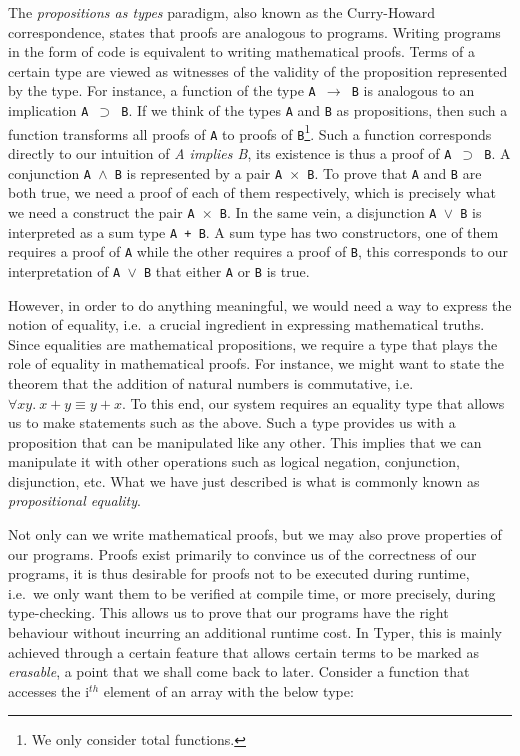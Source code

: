 \documentclass[12pt,twoside,maitrise]{dms}
\theoremstyle{definition}
\numberwithin{equation}{section}
\numberwithin{table}{chapter}
\numberwithin{figure}{chapter}
\newcommand\fn[1] {\texttt{#1}}
\begin{document}
The \emph{propositions as types} paradigm, also known as the Curry-Howard
correspondence, states that proofs are analogous to programs. Writing programs
in the form of code is equivalent to writing mathematical proofs. Terms of a
certain type are viewed as witnesses of the validity of the proposition
represented by the type. For instance, a function of the type \fn{A
  $\rightarrow$ B} is analogous to an implication \fn{A $\supset$ B}. If we
think of the types \fn{A} and \fn{B} as propositions, then such a function
transforms all proofs of \fn{A} to proofs of \fn{B}\footnote{We only consider
total functions.}. Such a function corresponds directly to our intuition of
\emph{A implies B}, its existence is thus a proof of \fn{A $\supset$ B}. A
conjunction \fn{A $\wedge$ B} is represented by a pair \fn{A $\times$ B}. To
prove that \fn{A} and \fn{B} are both true, we need a proof of each of them
respectively, which is precisely what we need a construct the pair \fn{A
  $\times$ B}. In the same vein, a disjunction \fn{A $\vee$ B} is interpreted as
a sum type \fn{A + B}. A sum type has two constructors, one of them requires a
proof of \fn{A} while the other requires a proof of \fn{B}, this corresponds to
our interpretation of \fn{A $\vee$ B} that either \fn{A} or \fn{B} is true.

However, in order to do anything meaningful, we would need a way to express the
notion of equality, i.e.\ a crucial ingredient in expressing mathematical
truths. Since equalities are mathematical propositions, we require a type that
plays the role of equality in mathematical proofs. For instance, we might want
to state the theorem that the addition of natural numbers is commutative, i.e.
$\forall xy. \ x + y \equiv y + x$. To this end, our system requires an equality
type that allows us to make statements such as the above. Such a type provides
us with a proposition that can be manipulated like any other. This implies that
we can manipulate it with other operations such as logical negation,
conjunction, disjunction, etc. What we have just described is what is commonly
known as \emph{propositional equality}.


Not only can we write mathematical proofs, but we may also prove properties of
our programs. Proofs exist primarily to convince us of the correctness of our
programs, it is thus desirable for proofs not to be executed during runtime,
i.e.\ we only want them to be verified at compile time, or more precisely,
during type-checking. This allows us to prove that our programs have the right
behaviour without incurring an additional runtime cost. In Typer, this is mainly
achieved through a certain feature that allows certain terms to be marked as
\emph{erasable}, a point that we shall come back to later. Consider a function
that accesses the i$^{th}$ element of an array with the below type:
\end{document}
